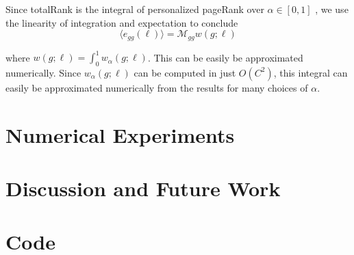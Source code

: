 \documentclass[12pt]{article}
\begin{document}
Since totalRank is the integral of personalized pageRank over $\alpha \in [0,1]$ \cite{boldi:2005} \cite{Peel:2018}, we use the linearity of integration and expectation to conclude
\begin{equation}
  \langle e_{gg}(\ell) \rangle = \mathcal{M}_{gg} w(g; \ell) 
\end{equation}

where $w(g; \ell) = \int_0^1 w_\alpha(g; \ell)$.  This can be easily be approximated numerically.  Since $w_\alpha (g;\ell)$ can be computed in just $O(C^2)$, this integral can easily be approximated numerically from the results for many choices of $\alpha$.














\section{Numerical Experiments}

\section{Discussion and Future Work}


\section*{Code}
\end{document}
